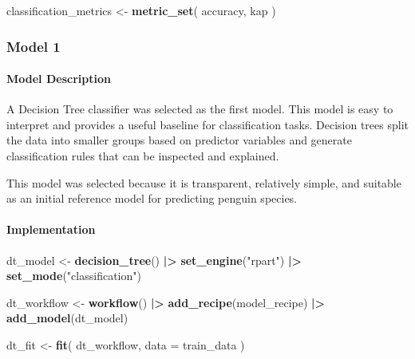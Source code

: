\documentclass[
]{article}
\newenvironment{Shaded}{\begin{snugshade}}{\end{snugshade}}
\newcommand{\AttributeTok}[1]{\textcolor[rgb]{0.13,0.29,0.53}{#1}}
\newcommand{\FunctionTok}[1]{\textcolor[rgb]{0.13,0.29,0.53}{\textbf{#1}}}
\newcommand{\NormalTok}[1]{#1}
\newcommand{\OtherTok}[1]{\textcolor[rgb]{0.56,0.35,0.01}{#1}}
\newcommand{\SpecialCharTok}[1]{\textcolor[rgb]{0.81,0.36,0.00}{\textbf{#1}}}
\newcommand{\StringTok}[1]{\textcolor[rgb]{0.31,0.60,0.02}{#1}}
\begin{document}
\begin{Shaded}
\begin{Highlighting}[]
\NormalTok{classification\_metrics }\OtherTok{\textless{}{-}} \FunctionTok{metric\_set}\NormalTok{(}
\NormalTok{  accuracy,}
\NormalTok{  kap}
\NormalTok{)}
\end{Highlighting}
\end{Shaded}

\subsubsection{Model 1}\label{model-1}

\paragraph{Model Description}\label{model-description}

A Decision Tree classifier was selected as the first model. This model
is easy to interpret and provides a useful baseline for classification
tasks. Decision trees split the data into smaller groups based on
predictor variables and generate classification rules that can be
inspected and explained.

This model was selected because it is transparent, relatively simple,
and suitable as an initial reference model for predicting penguin
species.

\paragraph{Implementation}\label{implementation}

\begin{Shaded}
\begin{Highlighting}[]
\NormalTok{dt\_model }\OtherTok{\textless{}{-}} \FunctionTok{decision\_tree}\NormalTok{() }\SpecialCharTok{|\textgreater{}}
  \FunctionTok{set\_engine}\NormalTok{(}\StringTok{"rpart"}\NormalTok{) }\SpecialCharTok{|\textgreater{}}
  \FunctionTok{set\_mode}\NormalTok{(}\StringTok{"classification"}\NormalTok{)}

\NormalTok{dt\_workflow }\OtherTok{\textless{}{-}} \FunctionTok{workflow}\NormalTok{() }\SpecialCharTok{|\textgreater{}}
  \FunctionTok{add\_recipe}\NormalTok{(model\_recipe) }\SpecialCharTok{|\textgreater{}}
  \FunctionTok{add\_model}\NormalTok{(dt\_model)}

\NormalTok{dt\_fit }\OtherTok{\textless{}{-}} \FunctionTok{fit}\NormalTok{(}
\NormalTok{  dt\_workflow,}
  \AttributeTok{data =}\NormalTok{ train\_data}
\NormalTok{)}
\end{Highlighting}
\end{Shaded}
\end{document}
